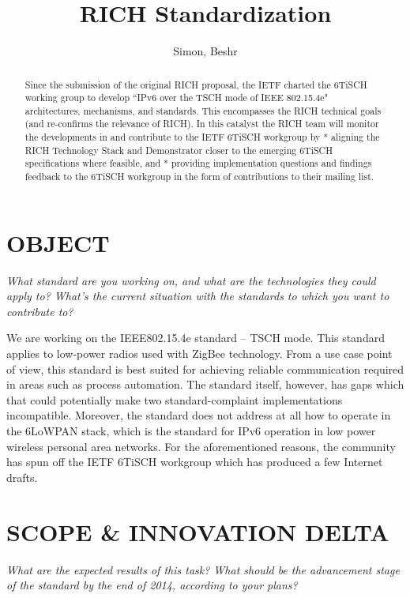 \documentclass[]{article}
\title{RICH Standardization}
\author{Simon, Beshr}
\begin{document}
\maketitle

\begin{abstract}
Since the submission of the original RICH proposal, the IETF charted the 6TiSCH working group to develop “IPv6 over the TSCH mode of IEEE 802.15.4e" architectures, mechanisms, and standards. This encompasses the RICH technical goals (and re-confirms the relevance of RICH). In this catalyst the RICH team will monitor the developments in and contribute to the IETF 6TiSCH workgroup by * aligning the RICH Technology Stack and Demonstrator closer to the emerging 6TiSCH specifications where feasible, and * providing implementation questions and findings feedback to the 6TiSCH workgroup in the form of contributions to their mailing list.
\end{abstract}

\section{OBJECT}

\emph{What standard are you working on, and what are the technologies they could apply to? What's the current situation with the standards to which you want to contribute to?}

We are working on the IEEE802.15.4e standard – TSCH mode. This standard applies to low-power radios used with ZigBee technology. 
From a use case point of view, this standard is best suited for achieving reliable communication required in areas such as process automation.
The standard itself, however, has gaps which that could potentially make two standard-complaint implementations incompatible.
Moreover, the standard does not address at all how to operate in the 6LoWPAN stack, which is the standard for IPv6 operation in low power wireless personal area networks. 
For the aforementioned reasons, the community has spun off the IETF 6TiSCH workgroup which has produced a few Internet drafts.

\section{SCOPE \& INNOVATION DELTA}

\emph{What are the expected results of this task? What should be the advancement stage of the standard by the end of 2014, according to your plans?}
\end{document}
